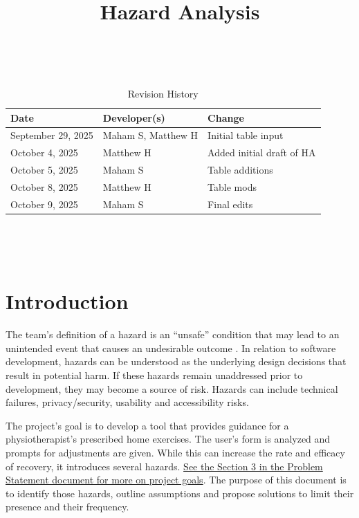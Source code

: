 \documentclass{article}
\title{Hazard Analysis\\\progname}
\author{\authname}
\date{}
\begin{document}
\maketitle
\thispagestyle{empty}

~\newpage


\begin{table}[hp]
\caption{Revision History} \label{TblRevisionHistory}
\begin{tabularx}{\textwidth}{llX}
\toprule
\textbf{Date} & \textbf{Developer(s)} & \textbf{Change}\\
\midrule
September 29, 2025 & Maham S, Matthew H & Initial table input \\
October 4, 2025 & Matthew H & Added initial draft of HA\\
October 5, 2025 & Maham S & Table additions \\
October 8, 2025 & Matthew H & Table mods \\
October 9, 2025 & Maham S & Final edits \\
\bottomrule
\end{tabularx}
\end{table}

~\newpage

\tableofcontents

~\newpage


\section{Introduction}

The team's definition of a hazard is an “unsafe” condition that may lead to an unintended event that causes an undesirable outcome \citep{IppolitoWallace1995}. In relation to software development, hazards can be understood as the underlying design decisions that result in potential harm. If these hazards remain unaddressed prior to development, they may become a source of risk. Hazards can include technical failures, privacy/security, usability and accessibility risks. 

The project's goal is to develop a tool that provides guidance for a physiotherapist's prescribed home exercises. The user's form is analyzed and prompts for adjustments are given. While this can increase the rate and efficacy of recovery, it introduces several hazards. \href{https://github.com/M9Huynh/technically-functional/blob/main/docs/SRS/SRS.pdf}{See the Section 3 in the Problem Statement document for more on project goals}. The purpose of this document is to identify those hazards, outline assumptions and propose solutions to limit their presence and their frequency.
\end{document}
